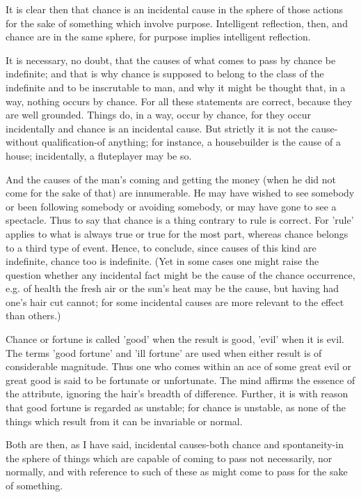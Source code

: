 It is clear then that chance is an incidental cause in the sphere
of those actions for the sake of something which involve purpose.
Intelligent reflection, then, and chance are in the same sphere, for
purpose implies intelligent reflection. 

It is necessary, no doubt, that the causes of what comes to pass by
chance be indefinite; and that is why chance is supposed to belong
to the class of the indefinite and to be inscrutable to man, and why
it might be thought that, in a way, nothing occurs by chance. For
all these statements are correct, because they are well grounded.
Things do, in a way, occur by chance, for they occur incidentally
and chance is an incidental cause. But strictly it is not the cause-without
qualification-of anything; for instance, a housebuilder is the cause
of a house; incidentally, a fluteplayer may be so. 

And the causes of the man's coming and getting the money (when he
did not come for the sake of that) are innumerable. He may have wished
to see somebody or been following somebody or avoiding somebody, or
may have gone to see a spectacle. Thus to say that chance is a thing
contrary to rule is correct. For 'rule' applies to what is always
true or true for the most part, whereas chance belongs to a third
type of event. Hence, to conclude, since causes of this kind are indefinite,
chance too is indefinite. (Yet in some cases one might raise the question
whether any incidental fact might be the cause of the chance occurrence,
e.g. of health the fresh air or the sun's heat may be the cause, but
having had one's hair cut cannot; for some incidental causes are more
relevant to the effect than others.) 

Chance or fortune is called 'good' when the result is good, 'evil'
when it is evil. The terms 'good fortune' and 'ill fortune' are used
when either result is of considerable magnitude. Thus one who comes
within an ace of some great evil or great good is said to be fortunate
or unfortunate. The mind affirms the essence of the attribute, ignoring
the hair's breadth of difference. Further, it is with reason that
good fortune is regarded as unstable; for chance is unstable, as none
of the things which result from it can be invariable or normal.

Both are then, as I have said, incidental causes-both chance and spontaneity-in
the sphere of things which are capable of coming to pass not necessarily,
nor normally, and with reference to such of these as might come to
pass for the sake of something. 

